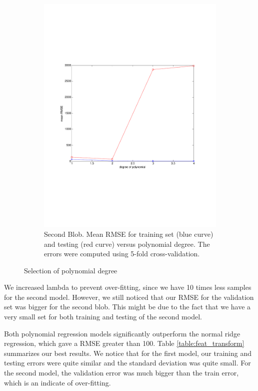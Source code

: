 \begin{figure}[h]
\begin{subfigure}[b]{0.45\textwidth}
    \includegraphics[width=\textwidth]{figures/degree_polynomial_blob2_crop.pdf}
    \caption{Second Blob. Mean RMSE for training set (blue curve) and testing (red curve) versus polynomial degree. The errors were computed using 5-fold cross-validation.}
    \label{fig:degre_blob2}
  \end{subfigure}
  \caption{Selection of polynomial degree}
\end{figure}

We increased lambda to prevent over-fitting, since we have 10 times less samples for the second model. However, we still noticed that our RMSE for the validation set was  bigger for the second blob. This might be due to the fact that we have a very small set for both training and testing of the second model.

Both polynomial regression models significantly outperform the normal ridge regression, which gave a RMSE greater than 100. Table \ref{table:feat_transform} summarizes our best results. We notice that for the first model, our training and testing errors were quite similar and the standard deviation was quite small. For the second model, the validation error was much bigger than the train error, which is an indicate of over-fitting. 

